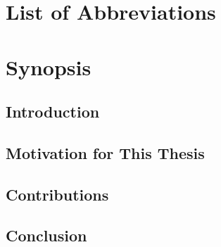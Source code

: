 \documentclass[twoside,fancyhdr]{18_format/csethesis}
\begin{document}
\restoregeometry
  \startOddPage
%  
%  
%  
  \chapter*{List of Abbreviations}
  
  \cleardoublepage
  \typeout{}
  \def\headrulehook{\color{black}}      %
  \acresetall
	\doublespace
\chapter*{Synopsis}
\section{Introduction}
\section{Motivation for This Thesis}
 \section{Contributions}
\section{Conclusion}
\end{document}
